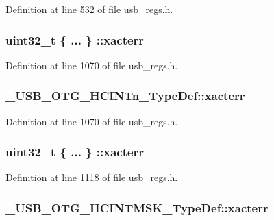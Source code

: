 Definition at line 532 of file usb\-\_\-regs.\-h.

\hypertarget{group___u_s_b___o_t_g___d_r_i_v_e_r_gabff86c0a1e4503ed7ffbec3deaf081c5}{
\subsubsection[{xacterr}]{\setlength{\rightskip}{0pt plus 5cm}uint32\-\_\-t \{ ... \} \-::xacterr}}\label{group___u_s_b___o_t_g___d_r_i_v_e_r_gabff86c0a1e4503ed7ffbec3deaf081c5}


Definition at line 1070 of file usb\-\_\-regs.\-h.

\hypertarget{group___u_s_b___o_t_g___d_r_i_v_e_r_ga75471b6f02970a40515aadb94078073c}{
\subsubsection[{xacterr}]{ \-\_\-\-U\-S\-B\-\_\-\-O\-T\-G\-\_\-\-H\-C\-I\-N\-Tn\-\_\-\-Type\-Def\-::xacterr}}\label{group___u_s_b___o_t_g___d_r_i_v_e_r_ga75471b6f02970a40515aadb94078073c}


Definition at line 1070 of file usb\-\_\-regs.\-h.

\hypertarget{group___u_s_b___o_t_g___d_r_i_v_e_r_ga48c757f0e9639c88b3cdd0b93ff58c17}{
\subsubsection[{xacterr}]{\setlength{\rightskip}{0pt plus 5cm}uint32\-\_\-t \{ ... \} \-::xacterr}}\label{group___u_s_b___o_t_g___d_r_i_v_e_r_ga48c757f0e9639c88b3cdd0b93ff58c17}


Definition at line 1118 of file usb\-\_\-regs.\-h.

\hypertarget{group___u_s_b___o_t_g___d_r_i_v_e_r_ga575ede38d9a02aeb3b8a2e6952ac1007}{
\subsubsection[{xacterr}]{ \-\_\-\-U\-S\-B\-\_\-\-O\-T\-G\-\_\-\-H\-C\-I\-N\-T\-M\-S\-K\-\_\-\-Type\-Def\-::xacterr}}\label{group___u_s_b___o_t_g___d_r_i_v_e_r_ga575ede38d9a02aeb3b8a2e6952ac1007}


